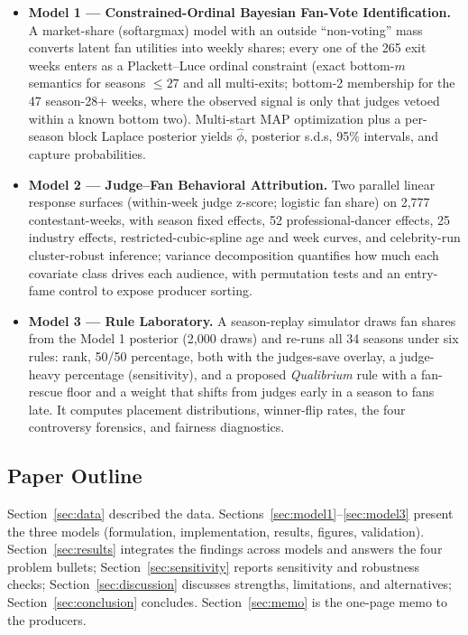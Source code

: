 \documentclass[11pt]{article}
\begin{document}
\begin{itemize}[leftmargin=2em]
\item \textbf{Model 1 --- Constrained-Ordinal Bayesian Fan-Vote Identification.}
A market-share (softargmax) model with an outside ``non-voting'' mass converts
latent fan utilities into weekly shares; every one of the 265 exit weeks enters as
a Plackett--Luce ordinal constraint (exact bottom-$m$ semantics for seasons
$\le 27$ and all multi-exits; bottom-2 membership for the 47 season-28+ weeks,
where the observed signal is only that judges vetoed within a known bottom two).
Multi-start MAP optimization plus a per-season block Laplace posterior yields
$\hat\phi$, posterior s.d.s, 95\% intervals, and capture probabilities.
\item \textbf{Model 2 --- Judge--Fan Behavioral Attribution.} Two parallel
linear response surfaces (within-week judge z-score; logistic fan share) on 2{,}777
contestant-weeks, with season fixed effects, 52 professional-dancer effects, 25
industry effects, restricted-cubic-spline age and week curves, and celebrity-run
cluster-robust inference; variance decomposition quantifies how much each covariate
class drives each audience, with permutation tests and an entry-fame control to
expose producer sorting.
\item \textbf{Model 3 --- Rule Laboratory.} A season-replay simulator draws fan
shares from the Model 1 posterior (2{,}000 draws) and re-runs all 34 seasons under
six rules: rank, 50/50 percentage, both with the judges-save overlay, a judge-heavy
percentage (sensitivity), and a proposed \emph{Qualibrium} rule with a fan-rescue
floor and a weight that shifts from judges early in a season to fans late. It
computes placement distributions, winner-flip rates, the four controversy
forensics, and fairness diagnostics.
\end{itemize}

\subsection{Paper Outline}

Section~\ref{sec:data} described the data. Sections~\ref{sec:model1}--\ref{sec:model3}
present the three models (formulation, implementation, results, figures, validation).
Section~\ref{sec:results} integrates the findings across models and answers the four
problem bullets; Section~\ref{sec:sensitivity} reports sensitivity and robustness
checks; Section~\ref{sec:discussion} discusses strengths, limitations, and
alternatives; Section~\ref{sec:conclusion} concludes. Section~\ref{sec:memo} is the
one-page memo to the producers.
\end{document}
